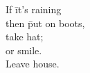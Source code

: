 \documentclass{report}
\begin{document}
\begin{tabbing}
    If \= it's raining \\
    \> then \= put on boots,\\
    \> \> take hat;\\
    \> or \> smile. \\
    Leave house.
\end{tabbing}
\end{document}
